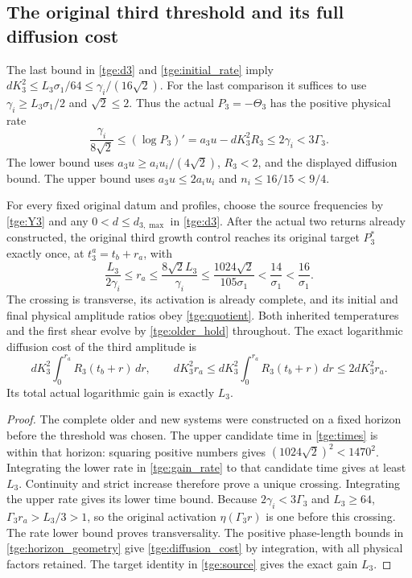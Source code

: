 \subsection{The original third threshold and its full diffusion cost}

The last bound in \eqref{tge:d3} and
\eqref{tge:initial_rate} imply
$dK_3^2\leq L_3\sigma_1/64\leq\gamma_i/(16\sqrt2)$.
For the last comparison it suffices to use
$\gamma_i\geq L_3\sigma_1/2$ and $\sqrt2\leq2$.
Thus the actual $P_3=-\Theta_3$ has the positive physical rate
\begin{equation}\label{tge:gain_rate}
 \frac{\gamma_i}{8\sqrt2}
 \leq(\log P_3)'=a_3u-dK_3^2R_3
 \leq2\gamma_i<3\Gamma_3.
\end{equation}
The lower bound uses $a_3u\geq a_iu_i/(4\sqrt2)$,
$R_3<2$, and the displayed diffusion bound. The upper bound
uses $a_3u\leq2a_iu_i$ and $n_i\leq16/15<9/4$.

\begin{theorem}\label{tge:actual_threshold}
For every fixed original datum and profiles, choose the source
frequencies by \eqref{tge:Y3} and any $0<d\leq d_{3,\max}$ in
\eqref{tge:d3}. After the actual two returns already constructed,
the original third growth control reaches its original target
$P_3^*$ exactly once, at $t_3^a=t_b+r_a$, with
\begin{equation}\label{tge:times}
 \frac{L_3}{2\gamma_i}\leq r_a
       \leq\frac{8\sqrt2L_3}{\gamma_i}
       \leq\frac{1024\sqrt2}{105\sigma_1}
       <\frac{14}{\sigma_1}<\frac{16}{\sigma_1}.
\end{equation}
The crossing is transverse, its activation is already complete,
and its initial and final physical amplitude ratios obey
\eqref{tge:quotient}. Both inherited temperatures and the first
shear evolve by \eqref{tge:older_hold} throughout.
The exact logarithmic diffusion cost of the third amplitude is
\begin{equation}\label{tge:diffusion_cost}
 dK_3^2\int_0^{r_a}R_3(t_b+r)\,dr,
 \qquad
 dK_3^2r_a\leq
 dK_3^2\int_0^{r_a}R_3(t_b+r)\,dr
                  \leq2dK_3^2r_a.
\end{equation}
Its total actual logarithmic gain is exactly $L_3$.
\end{theorem}
\begin{proof}
The complete older and new systems were constructed on a fixed horizon
before the threshold was chosen. The upper candidate time in
\eqref{tge:times} is within that horizon: squaring positive numbers
gives $(1024\sqrt2)^2<1470^2$. Integrating the lower rate in
\eqref{tge:gain_rate} to that candidate time gives at least $L_3$.
Continuity and strict increase therefore prove a unique crossing.
Integrating the upper rate gives its lower time bound.
Because $2\gamma_i<3\Gamma_3$ and $L_3\geq64$,
$\Gamma_3r_a>L_3/3>1$, so the original activation
$\eta(\Gamma_3r)$ is one before this crossing.
The rate lower bound proves transversality. The positive phase-length
bounds in \eqref{tge:horizon_geometry} give
\eqref{tge:diffusion_cost} by integration, with all physical factors
retained. The target identity in \eqref{tge:source} gives the exact
gain $L_3$.
\end{proof}

